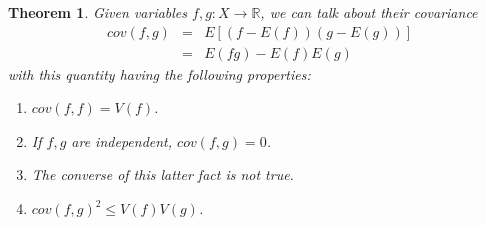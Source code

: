 \documentclass[12pt]{amsbook}
\newtheorem{theorem}{Theorem}[chapter]
\begin{document}
\begin{theorem}
Given variables $f,g:X\to\mathbb R$, we can talk about their covariance
\begin{eqnarray*}
cov(f,g)
&=&E[(f-E(f))(g-E(g))]\\
&=&E(fg)-E(f)E(g)
\end{eqnarray*}
with this quantity having the following properties:
\begin{enumerate}
\item $cov(f,f)=V(f)$.

\item If $f,g$ are independent, $cov(f,g)=0$.

\item The converse of this latter fact is not true.

\item $cov(f,g)^2\leq V(f)V(g)$.
\end{enumerate}
\end{theorem}
\end{document}
